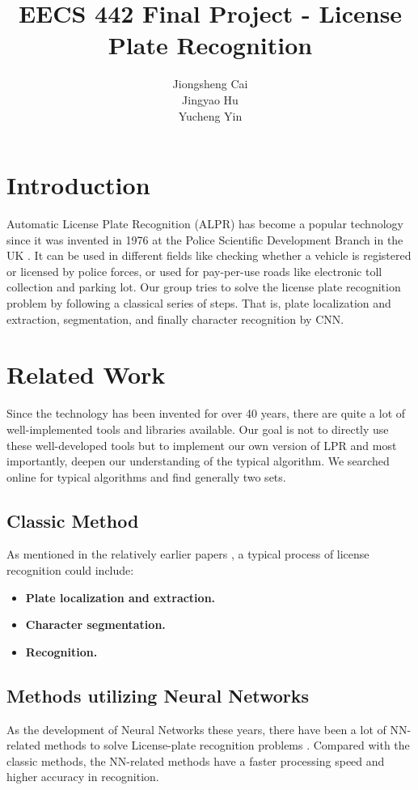 \documentclass{article}
\title{EECS 442 Final Project - License Plate Recognition}
\author{Jiongsheng Cai\\
			Jingyao Hu\\
			Yucheng Yin}
\begin{document}
\maketitle
\begin{spacing}{1.0}
\section{Introduction}
Automatic License Plate Recognition (ALPR) has become a popular technology since it was invented in 1976 at the Police Scientific Development Branch in the UK \cite{wikipedia_ANPR}. It can be used in different fields like checking whether a vehicle is registered or licensed by police forces, or used for pay-per-use roads like electronic toll collection and parking lot. Our group tries to solve the license plate recognition problem by following a classical series of steps. That is, plate localization and extraction, segmentation, and finally character recognition by CNN.

\section{Related Work}
Since the technology has been invented for over 40 years, there are quite a lot of well-implemented tools and libraries available. Our goal is not to directly use these well-developed tools but to implement our own version of LPR and most importantly, deepen our understanding of the typical algorithm. We searched online for typical algorithms and find generally two sets. 

\subsection{Classic Method}
As mentioned in the relatively earlier papers \cite{toda2005license}, a typical process of license recognition could include:
\begin{itemize}
	\item \textbf{Plate localization and extraction.}
	
	\item \textbf{Character segmentation.}
	
	\item \textbf{Recognition.}
\end{itemize}

\subsection{Methods utilizing Neural Networks}
As the development of Neural Networks these years, there have been a lot of NN-related methods to solve License-plate recognition problems \cite{Wu2017}. Compared with the classic methods, the NN-related methods have a faster processing speed and higher accuracy in recognition.


\end{spacing}
\end{document}
